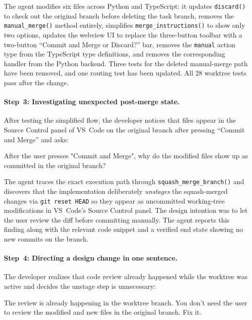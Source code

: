 \documentclass{article}
\begin{document}
\noindent The agent modifies six files across Python and TypeScript: it updates \texttt{discard()} to check out the original branch before deleting the task branch, removes the \texttt{manual\_merge()} method entirely, simplifies \texttt{merge\_instructions()} to show only two options, updates the webview UI to replace the three-button toolbar with a two-button ``Commit and Merge or Discard?'' bar, removes the \texttt{manual} action type from the TypeScript type definitions, and removes the corresponding handler from the Python backend.  Three tests for the deleted manual-merge path have been removed, and one routing test has been updated. All 28 worktree tests pass after the change.

\paragraph{Step~3: Investigating unexpected post-merge state.} After testing the simplified flow, the developer notices that files appear in the Source Control panel of VS~Code on the original branch after pressing ``Commit and Merge'' and asks:

\begin{prompt}
After the user presses "Commit and Merge", why do the modified files show up as 
committed in the original branch?
\end{prompt}

\noindent The agent traces the exact execution path through \texttt{squash\_merge\_branch()} and discovers that the implementation deliberately \emph{unstages} the squash-merged changes via \texttt{git reset HEAD} so they appear as uncommitted working-tree modifications in VS~Code's Source Control panel.  The design intention was to let the user review the diff before committing manually.  The agent reports this finding along with the relevant code snippet and a verified end state showing no new commits on the branch.

\paragraph{Step~4: Directing a design change in one sentence.} The developer realizes that code review already happened while the worktree was active and decides the unstage step is unnecessary:

\begin{prompt}
The review is already happening in the worktree branch. You don't need the user 
to review the modified and new files in the original branch. Fix it.
\end{prompt}
\end{document}
